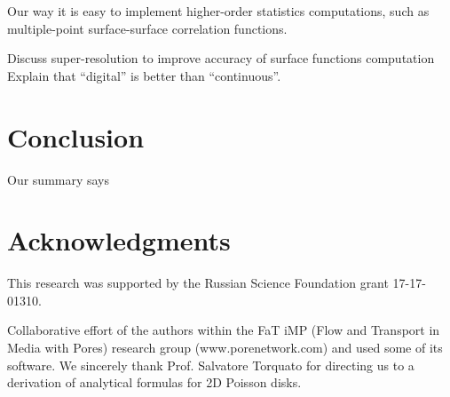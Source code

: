 \documentclass[reprint,amsmath,amssymb,aps,pre]{revtex4-1}
\begin{document}
Our way it is easy to implement higher-order statistics computations, such as
multiple-point surface-surface correlation functions.

Discuss super-resolution to improve accuracy of surface functions computation
Explain that ``digital'' is better than ``continuous''.

\section{Conclusion}
Our summary says

\section{Acknowledgments}
This research was supported by the Russian Science Foundation grant
17-17-01310.

Collaborative effort of the authors within the FaT iMP (Flow and Transport in
Media with Pores) research group (www.porenetwork.com) and used some of its
software. We sincerely thank Prof. Salvatore Torquato for directing us to a
derivation of analytical formulas for 2D Poisson disks.

\appendix
\end{document}
